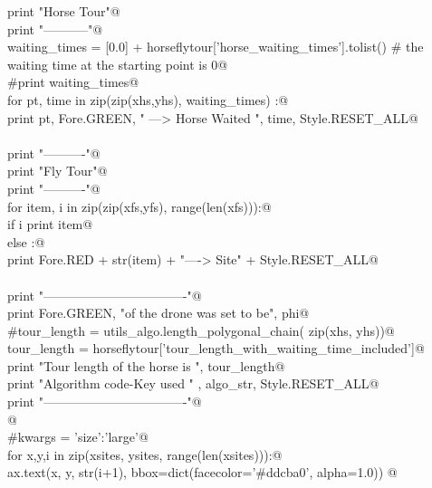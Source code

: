 \documentclass[11.5pt]{report}
\begin{document}
\begin{flushleft}
\begin{list}{}{}
\mbox{}\verb@    print "Horse Tour"@\\
\mbox{}\verb@    print "-----------"@\\
\mbox{}\verb@    waiting_times = [0.0] + horseflytour['horse_waiting_times'].tolist() # the waiting time at the starting point is 0@\\
\mbox{}\verb@    #print waiting_times@\\
\mbox{}\verb@    for pt, time in zip(zip(xhs,yhs), waiting_times) :@\\
\mbox{}\verb@        print pt, Fore.GREEN, " ---> Horse Waited ", time, Style.RESET_ALL@\\
\mbox{}\verb@@\\
\mbox{}\verb@    print "\n----------"@\\
\mbox{}\verb@    print "Fly Tour"@\\
\mbox{}\verb@    print "----------"@\\
\mbox{}\verb@    for item, i in zip(zip(xfs,yfs), range(len(xfs))):@\\
\mbox{}\verb@        if i%2 == 0:@\\
\mbox{}\verb@           print item@\\
\mbox{}\verb@        else :@\\
\mbox{}\verb@           print Fore.RED + str(item) + "----> Site" +  Style.RESET_ALL@\\
\mbox{}\verb@@\\
\mbox{}\verb@    print "----------------------------------"@\\
\mbox{}\verb@    print Fore.GREEN, "\nSpeed of the drone was set to be", phi@\\
\mbox{}\verb@    #tour_length = utils_algo.length_polygonal_chain( zip(xhs, yhs))@\\
\mbox{}\verb@    tour_length = horseflytour['tour_length_with_waiting_time_included']@\\
\mbox{}\verb@    print "Tour length of the horse is ",  tour_length@\\
\mbox{}\verb@    print "Algorithm code-Key used "    , algo_str, Style.RESET_ALL@\\
\mbox{}\verb@    print "----------------------------------\n"@\\
\mbox{}\verb@           @\\
\mbox{}\verb@    #kwargs = {'size':'large'}@\\
\mbox{}\verb@    for x,y,i in zip(xsites, ysites, range(len(xsites))):@\\
\mbox{}\verb@          ax.text(x, y, str(i+1), bbox=dict(facecolor='#ddcba0', alpha=1.0)) @\\

\end{list}
\end{flushleft}
\end{document}
